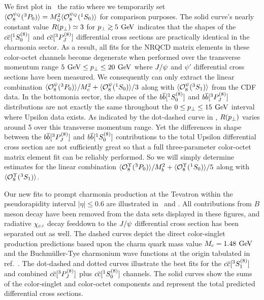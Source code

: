	We first plot in \PtoSratio\ the ratio 
%
\eqn{}
%
where we temporarily set $\langle{\cal O}_8^{\psi_{\scriptscriptstyle Q}}(^3P_0)\rangle = 
M_{\scriptscriptstyle Q}^2\langle{\cal O}_8^{\psi_{\scriptscriptstyle Q}}(^1S_0)\rangle$ for comparison purposes. 
%
%
The solid curve's nearly constant value $R(p_\perp) \simeq 3$ for $\pperp \gtap 
5 \GeV$ indicates that the shapes of the $c{\overline c}[ ^1S_0^{(8)}]$ and 
$c{\overline c}[ ^3P_J^{(8)}]$ differential cross sections are practically identical in 
the charmonia sector.  As a result, all fits for the NRQCD matrix elements in 
these color-octet channels become degenerate when performed over the transverse 
momentum range $5 {\>\, \rm GeV} \le p_\perp \le 20 {\>\, \rm GeV}$ where $J/\psi$ and $\psi'$ 
differential cross sections have been measured.  We consequently can only 
extract the linear combination $\langle{\cal O}_8^{\psi}(^3P_0)\rangle/M_c^2
+\langle{\cal O}_8^{\psi}(^1S_0)\rangle/3$ along with 
$\langle{\cal O}_8^{\psi}(^3S_1)\rangle$ from the CDF data.  In the bottomonia 
sector, the shapes of the $b{\overline b}[{}^1S_0^{(8)}]$ and $b{\overline b}[{}^3P_J^{(8)}]$ 
distributions are not exactly the same throughout the $0 \le p_\perp \le 15 
{\>\, \rm GeV}$ interval where Upsilon data exists.  As indicated by the dot-dashed 
curve in \PtoSratio, $R(p_\perp)$ varies around 5 over this transverse momentum 
range.  Yet the differences in shape between the $b{\overline b}[^3P_J^{(8)}]$ and 
$b{\overline b}[^1S_0^{(8)}]$ contributions to the total Upsilon differential cross 
section are not sufficiently great so that a full three-parameter color-octet 
matrix element fit can be reliably performed.  So we will simply determine 
estimates for the linear combination 
$\langle{\cal O}_8^{\Upsilon}(^3P_0)\rangle/M_b^2 + 
\langle{\cal O}_8^{\Upsilon}(^1S_0)\rangle/5$ along with 
$\langle{\cal O}_8^{\Upsilon}(^3S_1)\rangle$.

	Our new fits to prompt charmonia production at the Tevatron within the 
pseudorapidity interval $|\eta| \le 0.6$ are illustrated in \Psipxsect\ and 
\Jpsixsect.  All contributions from $B$ meson decay have been removed from the 
data sets displayed in these figures, and radiative $\chi_{c{\scriptscriptstyle J}}$ decay feeddown to 
the $J/\psi$ differential cross section has been separated out as well.  
The dashed curves depict the direct color-singlet production predictions 
based upon the charm quark mass value $M_c=1.48 {\>\, \rm GeV}$ and the Buchm\"uller-Tye 
charmonium wave functions at the origin tabulated in ref.~\Quigg. 
The dot-dashed and dotted curves illustrate the best fits for 
the $c{\overline c}[ ^3S_1^{(8)}]$ and combined $c{\overline c}[ ^3P_J^{(8)}]$ plus $c{\overline c}[ ^1S_0^{(8)}]$ 
channels.  The solid curves show the sums of the color-singlet and color-octet 
components and represent the total predicted differential cross sections.  

